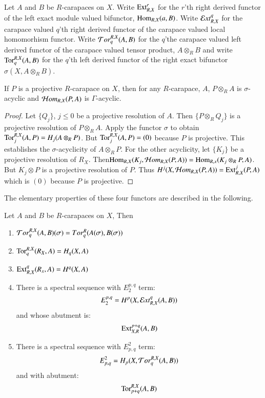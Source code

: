 \begin{definition}\label{art6-definition-3.2}
Let $A$ and $B$ be $R$-carapaces on $X$. Write $\operatorname{Ext}_{R, X}^{r}$ for the $r$'th right derived functor of the left exact module valued bifunctor, $\operatorname{Hom}_{R, X}(a, B)$. Write $\mathcal{E} xt_{R, X}^{q}$ for the carapace valued $q$'th right derived functor of the carapace valued local homomorhism functor. Write $\mathcal{T} or_{q}^{R,X}(A, B)$ for the $q$'the carapace valued left derived functor of the carapace valued tensor product, $A\otimes_{R}B$ and write $\operatorname{Tor}_{q}^{R, X}(A, B)$ for the $q$'th left derived functor of the right exact bifunctor $\sigma(X, A\otimes_{R}B)$. 
\end{definition}

\begin{lemma}\label{art6-lemma-3.3}
If $P$ is a projective $R$-carapace on $X$, then for any $R$-carapace, $A$, $P\otimes_{R} A$ is $\sigma$-acyclic and $\mathcal{H} om_{R, X}(P, A)$ is $\Gamma$-acyclic.
\end{lemma}

\begin{proof}
Let $\{Q_{j}\}$, $j \leq 0$ be  a projective resolution of $A$. Then $\{P \otimes_{R} Q_{j}\}$ is a projective resolution of $P \otimes_{R} A$. Apply the functor $\sigma$ to obtain $\operatorname{Tor}_{j}^{R,X}(A, P) = H_{j}(A\otimes_{R}P)$. But $\operatorname{Tor}_{j}^{R, X}(A, P) = (0)$ because $P$ is projective. This establishes the $\sigma$-acyclicity of $A\otimes_{R}P$. For the other acyclicity, let $\{K_{j}\}$ be a projective resolution of $R_{X}$. Then\break $\operatorname{Hom}_{R, X}(K_{j}, \mathcal{H} om_{R, X}(P, A)) = \operatorname{Hom}_{R, x}(K_{j}\otimes_{R}P, A)$. But $K_{j} \otimes P$ is a projective resolution of $P$. Thus $H^{j}(X, \mathcal{H} om_{R,X}(P, A)) = \operatorname{Ext}_{R, X}^{j}(P, A)$ which is $(0)$ because $P$ is projective.
\end{proof}

The elementary properties of these four functors are described in the following.

\begin{prop}\label{art6-lemma-3.4}
Let $A$ and $B$ be $R$-carapaces on $X$, Then
    \begin{enumerate}[(1)]
    \item $\mathcal{T} or_{q}^{R,X}(A, B)(\sigma) = Tor_{q}^{R}(A(\sigma), B(\sigma))$\label{art6-lemma3.4-enum-1}
    \item $\operatorname{Tor}_{q}^{R, X}(R_{X}, A) = H_{q}(X, A)$\label{art6-lemma3.4-enum-2}
    \item $\operatorname{Ext}_{R,X}^{q}(R_{x}, A) = H^{q}(X,A)$\label{art6-lemma3.4-enum-3}
    \item There is a spectral sequence with $E_{2}^{p,q}$ term:\label{art6-lemma3.4-enum-4}
    $$
    E_{2}^{p,q} = H^{p}(X, \mathcal{E} xt_{R,X}^{q}(A, B))
    $$
    and whose abutment is:
    $$
    \operatorname{Ext}_{X,R}^{p+q}(A, B)
    $$
    \item There is a spectral sequence with $E_{p,q}^{2}$ term:\label{art6-lemma3.4-enum-5}
    $$
    E_{p,q}^{2} = H_{p}(X, \mathcal{T} or_{q}^{R, X}(A, B))
    $$
    and with abutment:
    $$
    \operatorname{Tor}_{p+q}^{R,X}(A, B)
    $$
    \end{enumerate}
\end{prop}

